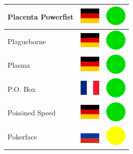 \documentclass[12pt, a4paper, twoside]{report}
\begin{document}
\begin{center}
\begin{longtable}{|p{5cm}|p{2cm}|p{2cm}|}
Placenta Powerfist & \includegraphics[width=1cm]{4x3/de} & \includegraphics[width=1cm]{likes/y} \\ \hline
Plagueborne & \includegraphics[width=1cm]{4x3/de} & \includegraphics[width=1cm]{likes/y} \\ \hline
Plasma & \includegraphics[width=1cm]{4x3/de} & \includegraphics[width=1cm]{likes/y} \\ \hline
P.O. Box & \includegraphics[width=1cm]{4x3/fr} & \includegraphics[width=1cm]{likes/y} \\ \hline
Poisöned Speed & \includegraphics[width=1cm]{4x3/de} & \includegraphics[width=1cm]{likes/y} \\ \hline
Pokerface & \includegraphics[width=1cm]{4x3/ru} & \includegraphics[width=1cm]{likes/m} \\ \hline

\end{longtable}
\end{center}
\end{document}
